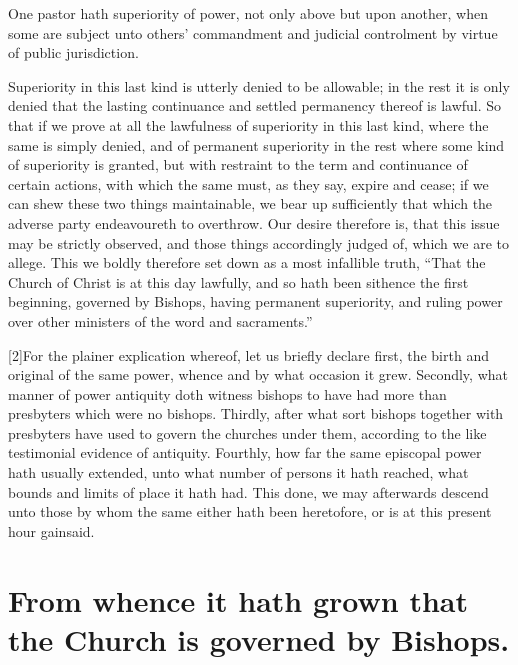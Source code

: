 One pastor hath superiority of power, not only above but upon another, when some are subject unto others’ commandment and judicial controlment by virtue of public jurisdiction.

Superiority in this last kind is utterly denied to be allowable; in the rest it is only denied that the lasting continuance and settled permanency thereof is lawful. So that if we prove at all the lawfulness of superiority in this last kind, where the same is simply denied, and of permanent superiority in the rest where some kind of superiority is granted, but with restraint to the term and continuance of certain actions, with which the same must, as they say, expire and cease; if we can shew these two things maintainable, we bear up sufficiently that which the adverse party endeavoureth to overthrow. Our desire therefore is, that this issue may be strictly observed, and those things accordingly judged of, which we are to allege. This we boldly therefore set down as a most infallible truth, “That the Church of Christ is at this day lawfully, and so hath been sithence the first beginning, governed by Bishops, having permanent superiority, and ruling power over other ministers of the word and sacraments.”

[2]For the plainer explication whereof, let us briefly declare first, the birth and original of the same power, whence and by what occasion it grew. Secondly, what manner of power antiquity doth witness bishops to have had more than presbyters which were no bishops. Thirdly, after what sort bishops together with presbyters have used to govern the  churches under them,
 according to the like testimonial evidence of antiquity. Fourthly, how far the same episcopal power hath usually extended, unto what number of persons it hath reached, what bounds and limits of place it hath had. This done, we may afterwards descend unto those by whom the same either hath been heretofore, or is at this present hour gainsaid.

\section*{From whence it hath grown that the Church is governed by Bishops.}


